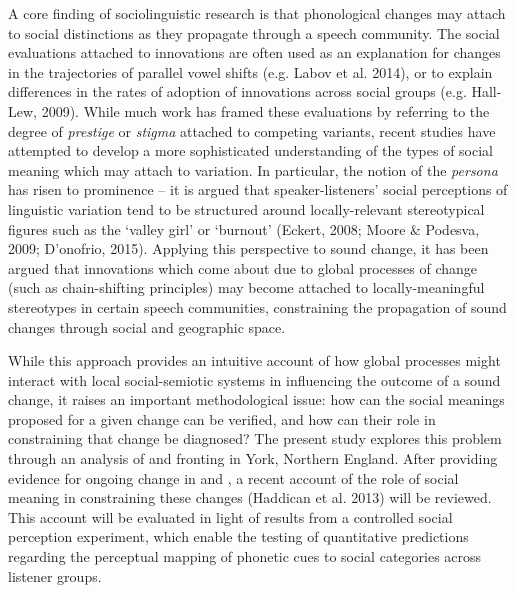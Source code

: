 \documentclass[PWPL]{article}
\begin{document}
A core finding of sociolinguistic research is that phonological changes may attach to social distinctions as they propagate through a speech community. The social evaluations attached to innovations are often used as an explanation for changes in the trajectories of parallel vowel shifts (e.g. Labov et al. 2014), or to explain differences in the rates of adoption of innovations across social groups (e.g. Hall-Lew, 2009). While much work has framed these evaluations by referring to the degree of \textit{prestige} or \textit{stigma} attached to competing variants, recent studies have attempted to develop a more sophisticated understanding of the types of social meaning which may attach to variation. In particular, the notion of the \textit{persona} has risen to prominence -- it is argued that speaker-listeners' social perceptions of linguistic variation tend to be structured around locally-relevant stereotypical figures such as the `valley girl' or `burnout' (Eckert, 2008; Moore \& Podesva, 2009; D'onofrio, 2015). Applying this perspective to sound change, it has been argued that innovations which come about due to global processes of change (such as chain-shifting principles) may become attached to locally-meaningful stereotypes in certain speech communities, constraining the propagation of sound changes through social and geographic space. 

While this approach provides an intuitive account of how global processes might interact with local social-semiotic systems in influencing the outcome of a sound change, it raises an important methodological issue: how can the social meanings proposed for a given change can be verified, and how can their role in constraining that change be diagnosed? The present study explores this problem through an analysis of  and  fronting in York, Northern England. After providing evidence for ongoing change in  and , a recent account of the role of social meaning in constraining these changes (Haddican et al. 2013) will be reviewed. This account will be evaluated in light of results from a controlled social perception experiment, which enable the testing of quantitative predictions regarding the perceptual mapping of phonetic cues to social categories across listener groups.



\end{document}
